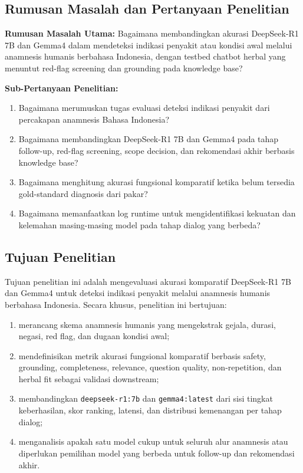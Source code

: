 \documentclass[conference]{IEEEtran}
\begin{document}
\subsection{Rumusan Masalah dan Pertanyaan Penelitian}

\textbf{Rumusan Masalah Utama:} Bagaimana membandingkan akurasi DeepSeek-R1 7B dan Gemma4 dalam mendeteksi indikasi penyakit atau kondisi awal melalui anamnesis humanis berbahasa Indonesia, dengan testbed chatbot herbal yang menuntut red-flag screening dan grounding pada knowledge base?

\textbf{Sub-Pertanyaan Penelitian:}
\begin{enumerate}
\item Bagaimana merumuskan tugas evaluasi deteksi indikasi penyakit dari percakapan anamnesis Bahasa Indonesia?
\item Bagaimana membandingkan DeepSeek-R1 7B dan Gemma4 pada tahap follow-up, red-flag screening, scope decision, dan rekomendasi akhir berbasis knowledge base?
\item Bagaimana menghitung akurasi fungsional komparatif ketika belum tersedia gold-standard diagnosis dari pakar?
\item Bagaimana memanfaatkan log runtime untuk mengidentifikasi kekuatan dan kelemahan masing-masing model pada tahap dialog yang berbeda?
\end{enumerate}

\subsection{Tujuan Penelitian}

Tujuan penelitian ini adalah mengevaluasi akurasi komparatif DeepSeek-R1 7B dan Gemma4 untuk deteksi indikasi penyakit melalui anamnesis humanis berbahasa Indonesia. Secara khusus, penelitian ini bertujuan:
\begin{enumerate}
\item merancang skema anamnesis humanis yang mengekstrak gejala, durasi, negasi, red flag, dan dugaan kondisi awal;
\item mendefinisikan metrik akurasi fungsional komparatif berbasis safety, grounding, completeness, relevance, question quality, non-repetition, dan herbal fit sebagai validasi downstream;
\item membandingkan \texttt{deepseek-r1:7b} dan \texttt{gemma4:latest} dari sisi tingkat keberhasilan, skor ranking, latensi, dan distribusi kemenangan per tahap dialog;
\item menganalisis apakah satu model cukup untuk seluruh alur anamnesis atau diperlukan pemilihan model yang berbeda untuk follow-up dan rekomendasi akhir.
\end{enumerate}
\end{document}
